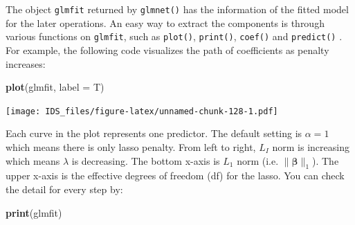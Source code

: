 \documentclass[12pt,]{krantz}
\makeatletter
\newenvironment{Shaded}{\begin{snugshade}}{\end{snugshade}}
\newcommand{\CommentTok}[1]{\textcolor[rgb]{0.37,0.37,0.37}{\textit{#1}}}
\newcommand{\DataTypeTok}[1]{\textcolor[rgb]{0.27,0.27,0.27}{#1}}
\newcommand{\DecValTok}[1]{\textcolor[rgb]{0.06,0.06,0.06}{#1}}
\newcommand{\KeywordTok}[1]{\textcolor[rgb]{0.27,0.27,0.27}{\textbf{#1}}}
\newcommand{\NormalTok}[1]{#1}
\newcommand{\OperatorTok}[1]{\textcolor[rgb]{0.43,0.43,0.43}{\textbf{#1}}}
\newcommand{\StringTok}[1]{\textcolor[rgb]{0.5,0.5,0.5}{#1}}
\newenvironment{kframe}{%
\medskip{}
\setlength{\fboxsep}{.8em}
 \def\at@end@of@kframe{}%
 \ifinner\ifhmode%
  \def\at@end@of@kframe{\end{minipage}}%
  \begin{minipage}{\columnwidth}%
 \fi\fi%
 \def\FrameCommand##1{\hskip\@totalleftmargin \hskip-\fboxsep
 \colorbox{shadecolor}{##1}\hskip-\fboxsep
     \hskip-\linewidth \hskip-\@totalleftmargin \hskip\columnwidth}%
 \MakeFramed {\advance\hsize-\width
   \@totalleftmargin\z@ \linewidth\hsize
   \@setminipage}}%
 {\par\unskip\endMakeFramed%
 \at@end@of@kframe}
\renewenvironment{Shaded}{\begin{kframe}}{\end{kframe}}
\makeatother
\begin{document}
\begin{Shaded}
\end{Shaded}

The object \texttt{glmfit} returned by \texttt{glmnet()} has the information of the fitted model for the later operations. An easy way to extract the components is through various functions on \texttt{glmfit}, such as \texttt{plot()}, \texttt{print()}, \texttt{coef()} and \texttt{predict()} . For example, the following code visualizes the path of coefficients as penalty increases:

\begin{Shaded}
\begin{Highlighting}[]
\KeywordTok{plot}\NormalTok{(glmfit, }\DataTypeTok{label =}\NormalTok{ T)}
\end{Highlighting}
\end{Shaded}

\texttt{[image: IDS\_files/figure-latex/unnamed-chunk-128-1.pdf]}

Each curve in the plot represents one predictor. The default setting is \(\alpha=1\) which means there is only lasso penalty. From left to right, \(L_I\) norm is increasing which means \(\lambda\) is decreasing. The bottom x-axis is \(L_1\) norm (i.e. \(\parallel\symbf{\beta}\parallel_{1}\)). The upper x-axis is the effective degrees of freedom (df) for the lasso. You can check the detail for every step by:

\begin{Shaded}
\begin{Highlighting}[]
\KeywordTok{print}\NormalTok{(glmfit)}
\end{Highlighting}
\end{Shaded}
\end{document}
